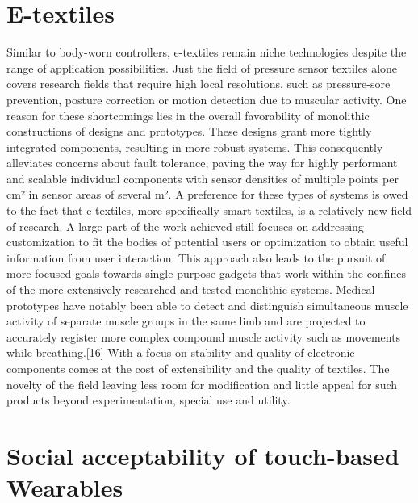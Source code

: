 \documentclass{sigchi}
\begin{document}
\section{E-textiles}
Similar to body-worn controllers, e-textiles remain niche technologies despite the range of application possibilities. Just the field of pressure sensor textiles alone covers research fields that require high local resolutions, such as pressure-sore prevention, posture correction \cite{smart-rehabilitation} or motion detection due to muscular activity. \cite{vogel5}
One reason for these shortcomings lies in the overall favorability of monolithic constructions of designs and prototypes. These designs grant more tightly integrated components, resulting in more robust systems. This consequently alleviates concerns about fault tolerance, paving the way for highly performant and scalable individual components with sensor densities of multiple points per cm² in sensor areas of several m².\cite{vogel4}  A preference for these  types of systems is owed to the fact that e-textiles, more specifically smart textiles, is a relatively new field of research. \cite{simpleskin} A large part of the work achieved still focuses on addressing customization to fit the bodies of potential users or optimization to obtain useful information from user interaction. \cite{smart-rehabilitation} This approach also leads to the pursuit of more focused goals towards single-purpose gadgets that work within the confines of the more extensively researched and tested monolithic systems. Medical prototypes have notably been able to detect and distinguish simultaneous muscle activity of separate muscle groups in the same limb and are projected to accurately register more complex compound muscle activity such as movements while breathing.[16] With a focus on stability and quality of electronic components comes at the cost of extensibility and the quality of textiles. The novelty of the field  leaving less room for modification and little appeal for such products beyond experimentation, special use and utility. \cite{simpleskin, vogel4} %

\section{Social acceptability of touch-based Wearables}
\end{document}
